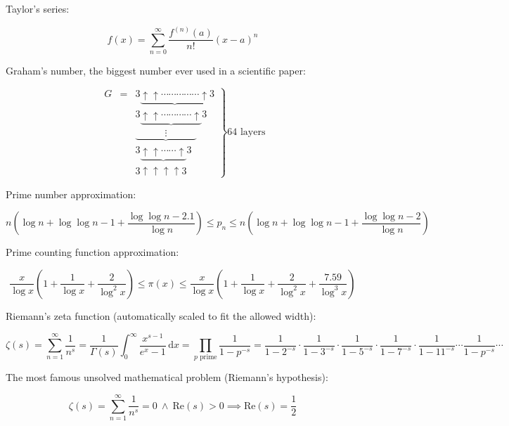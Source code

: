 \documentclass{article}
\begin{document}
Taylor's series:

$$f(x)=\sum_{n=0}^\infty \frac{f^{(n)}(a)}{n!} (x-a)^n$$

Graham's number, the biggest number ever used in a scientific paper:

\[
\left.
 \begin{matrix}
  G &=&3\underbrace{\uparrow \uparrow \cdots \cdots \cdots \cdots \cdots \uparrow}3 \\
    & &3\underbrace{\uparrow \uparrow \cdots \cdots \cdots \cdots \uparrow}3 \\
    & & \underbrace{\qquad \quad \vdots \qquad \quad} \\
    & &3\underbrace{\uparrow \uparrow \cdots \cdots \uparrow}3 \\
    & &3\uparrow \uparrow \uparrow \uparrow3
 \end{matrix}
\right \} \text{64 layers}
\]

Prime number approximation:

$$ n \left( \log n + \log \log n - 1 + \frac{\log \log n - 2.1}{\log n} \right) \le p_n \le n \left( \log n + \log \log n - 1 + \frac{\log \log n - 2}{\log n} \right)$$

Prime counting function approximation:

\[
\frac{x}{\log x} \left( 1 + \frac{1}{\log x} + \frac{2}{\log^2 x} \right) \le \pi(x) \le \frac{x}{\log x} \left( 1 + \frac{1}{\log x} + \frac{2}{\log^2 x} + \frac{7.59}{\log^3 x} \right)
\]

Riemann's zeta function (automatically scaled to fit the allowed width):

\[
\zeta(s) = \sum_{n=1}^\infty \frac{1}{n^s} = \frac{1}{\Gamma(s)} \int_0^\infty \frac{x ^ {s-1}}{e ^ x - 1} \, \mathrm{d}x = \prod_{p \text{ prime}} \frac{1}{1-p^{-s}} = \frac{1}{1-2^{-s}}\cdot\frac{1}{1-3^{-s}}\cdot\frac{1}{1-5^{-s}}\cdot\frac{1}{1-7^{-s}}\cdot\frac{1}{1-11^{-s}} \cdots \frac{1}{1-p^{-s}} \cdots
\]

The most famous unsolved mathematical problem (Riemann's hypothesis):

\[
  \zeta(s) = \sum_{n=1}^\infty \frac{1}{n^s} = 0\ \land \ \mathrm{Re}(s) > 0 \implies \mathrm{Re}(s)=\frac12
\]
\end{document}
